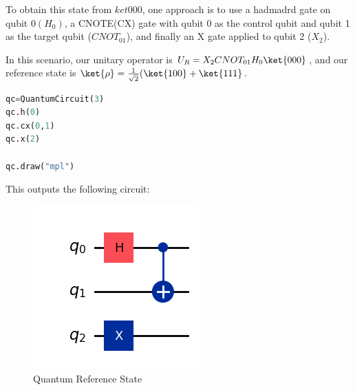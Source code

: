\documentclass[12pt, oneside]{book}
\theoremstyle{definition}
\theoremstyle{definition}
\theoremstyle{remark}
\begin{document}
To obtain this state from $ket{000}$, one approach is to use a hadmadrd gate on qubit $0 (H_0)$, a CNOTE(CX) gate with qubit 0 as the control qubit and qubit 1 as the target qubit ($CNOT_{01}$), and finally an X gate applied to qubit 2 ($X_2$).

In this scenario, our unitary operator is $U_R=X_2CNOT_{01}H_0\ket{000}$, and our reference state is $\ket{\rho}=\frac{1}{\sqrt{2}}(\ket{100}+\ket{111}$.
\begin{lstlisting}[language=Python]
qc=QuantumCircuit(3)
qc.h(0)
qc.cx(0,1)
qc.x(2)

qc.draw("mpl")
\end{lstlisting}
This outputs the following circuit:
\begin{figure}[H]
    \centering
    \includegraphics[width=0.5\linewidth]{../images/ref_state_quantum.png}
    \caption{Quantum Reference State}
    \label{fig:ref_state_quantum}
\end{figure}
\end{document}
